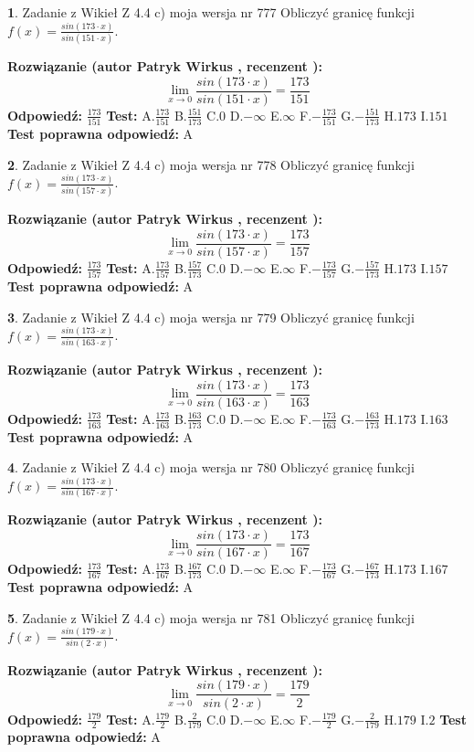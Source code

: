 \documentclass[12pt, a4paper]{article}
\theoremstyle{definition} %
\newtheorem{zad}{}
\newcommand{\zadStart}[1]{\begin{zad}#1\newline}
\newcommand{\zadStop}{\end{zad}}
\newcommand{\rozwStart}[2]{\noindent \textbf{Rozwiązanie (autor #1 , recenzent #2): }\newline}
\newcommand{\rozwStop}{\newline}
\newcommand{\odpStart}{\noindent \textbf{Odpowiedź:}\newline}
\newcommand{\odpStop}{\newline}
\newcommand{\testStart}{\noindent \textbf{Test:}\newline}
\newcommand{\testStop}{\newline}
\newcommand{\kluczStart}{\noindent \textbf{Test poprawna odpowiedź:}\newline}
\newcommand{\kluczStop}{\newline}
\begin{document}
\zadStart{Zadanie z Wikieł Z 4.4 c) moja wersja nr 777}
Obliczyć granicę funkcji $f(x)=\frac{sin(173\cdot x)}{sin(151\cdot x)}$.
\zadStop
\rozwStart{Patryk Wirkus}{}
$$\lim\limits_{x\to 0}\frac{sin(173\cdot x)}{sin(151\cdot x)}=
\frac{173}{151}$$
\rozwStop
\odpStart
$\frac{173}{151}$
\odpStop
\testStart
A.$\frac{173}{151}$
B.$\frac{151}{173}$
C.$0$
D.$-\infty$
E.$\infty$
F.$-\frac{173}{151}$
G.$-\frac{151}{173}$
H.$173$
I.$151$
\testStop
\kluczStart
A
\kluczStop



\zadStart{Zadanie z Wikieł Z 4.4 c) moja wersja nr 778}
Obliczyć granicę funkcji $f(x)=\frac{sin(173\cdot x)}{sin(157\cdot x)}$.
\zadStop
\rozwStart{Patryk Wirkus}{}
$$\lim\limits_{x\to 0}\frac{sin(173\cdot x)}{sin(157\cdot x)}=
\frac{173}{157}$$
\rozwStop
\odpStart
$\frac{173}{157}$
\odpStop
\testStart
A.$\frac{173}{157}$
B.$\frac{157}{173}$
C.$0$
D.$-\infty$
E.$\infty$
F.$-\frac{173}{157}$
G.$-\frac{157}{173}$
H.$173$
I.$157$
\testStop
\kluczStart
A
\kluczStop



\zadStart{Zadanie z Wikieł Z 4.4 c) moja wersja nr 779}
Obliczyć granicę funkcji $f(x)=\frac{sin(173\cdot x)}{sin(163\cdot x)}$.
\zadStop
\rozwStart{Patryk Wirkus}{}
$$\lim\limits_{x\to 0}\frac{sin(173\cdot x)}{sin(163\cdot x)}=
\frac{173}{163}$$
\rozwStop
\odpStart
$\frac{173}{163}$
\odpStop
\testStart
A.$\frac{173}{163}$
B.$\frac{163}{173}$
C.$0$
D.$-\infty$
E.$\infty$
F.$-\frac{173}{163}$
G.$-\frac{163}{173}$
H.$173$
I.$163$
\testStop
\kluczStart
A
\kluczStop



\zadStart{Zadanie z Wikieł Z 4.4 c) moja wersja nr 780}
Obliczyć granicę funkcji $f(x)=\frac{sin(173\cdot x)}{sin(167\cdot x)}$.
\zadStop
\rozwStart{Patryk Wirkus}{}
$$\lim\limits_{x\to 0}\frac{sin(173\cdot x)}{sin(167\cdot x)}=
\frac{173}{167}$$
\rozwStop
\odpStart
$\frac{173}{167}$
\odpStop
\testStart
A.$\frac{173}{167}$
B.$\frac{167}{173}$
C.$0$
D.$-\infty$
E.$\infty$
F.$-\frac{173}{167}$
G.$-\frac{167}{173}$
H.$173$
I.$167$
\testStop
\kluczStart
A
\kluczStop



\zadStart{Zadanie z Wikieł Z 4.4 c) moja wersja nr 781}
Obliczyć granicę funkcji $f(x)=\frac{sin(179\cdot x)}{sin(2\cdot x)}$.
\zadStop
\rozwStart{Patryk Wirkus}{}
$$\lim\limits_{x\to 0}\frac{sin(179\cdot x)}{sin(2\cdot x)}=
\frac{179}{2}$$
\rozwStop
\odpStart
$\frac{179}{2}$
\odpStop
\testStart
A.$\frac{179}{2}$
B.$\frac{2}{179}$
C.$0$
D.$-\infty$
E.$\infty$
F.$-\frac{179}{2}$
G.$-\frac{2}{179}$
H.$179$
I.$2$
\testStop
\kluczStart
A
\kluczStop
\end{document}
